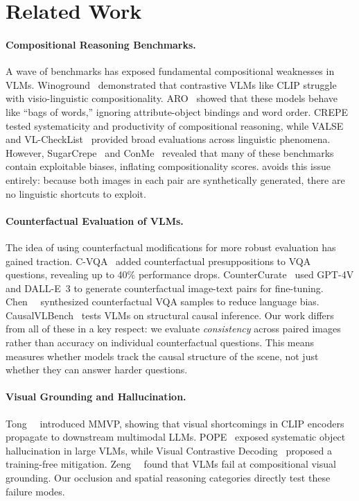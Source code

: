 \section{Related Work}
\label{sec:related}

\paragraph{Compositional Reasoning Benchmarks.}
A wave of benchmarks has exposed fundamental compositional weaknesses in VLMs. Winoground~\cite{thrush2022winoground} demonstrated that contrastive VLMs like CLIP struggle with visio-linguistic compositionality. ARO~\cite{yuksekgonul2023aro} showed that these models behave like ``bags of words,'' ignoring attribute-object bindings and word order. CREPE~\cite{ma2023crepe} tested systematicity and productivity of compositional reasoning, while VALSE~\cite{parcalabescu2022valse} and VL-CheckList~\cite{zhao2022vlchecklist} provided broad evaluations across linguistic phenomena. However, SugarCrepe~\cite{hsieh2023sugarcrepe} and ConMe~\cite{huang2024conme} revealed that many of these benchmarks contain exploitable biases, inflating compositionality scores. \method avoids this issue entirely: because both images in each pair are synthetically generated, there are no linguistic shortcuts to exploit.

\paragraph{Counterfactual Evaluation of VLMs.}
The idea of using counterfactual modifications for more robust evaluation has gained traction. C-VQA~\cite{zhang2024whatif} added counterfactual presuppositions to VQA questions, revealing up to 40\% performance drops. CounterCurate~\cite{zhang2024countercurate} used GPT-4V and DALL-E~3 to generate counterfactual image-text pairs for fine-tuning. Chen~\etal~\cite{chen2020counterfactual} synthesized counterfactual VQA samples to reduce language bias. CausalVLBench~\cite{komanduri2025causalvlbench} tests VLMs on structural causal inference. Our work differs from all of these in a key respect: we evaluate \emph{consistency} across paired images rather than accuracy on individual counterfactual questions. This means \method measures whether models track the causal structure of the scene, not just whether they can answer harder questions.

\paragraph{Visual Grounding and Hallucination.}
Tong~\etal~\cite{tong2024eyeswideShut} introduced MMVP, showing that visual shortcomings in CLIP encoders propagate to downstream multimodal LLMs. POPE~\cite{li2023pope} exposed systematic object hallucination in large VLMs, while Visual Contrastive Decoding~\cite{leng2024vcd} proposed a training-free mitigation. Zeng~\etal~\cite{zeng2024arpgrounding} found that VLMs fail at compositional visual grounding. Our occlusion and spatial reasoning categories directly test these failure modes.

